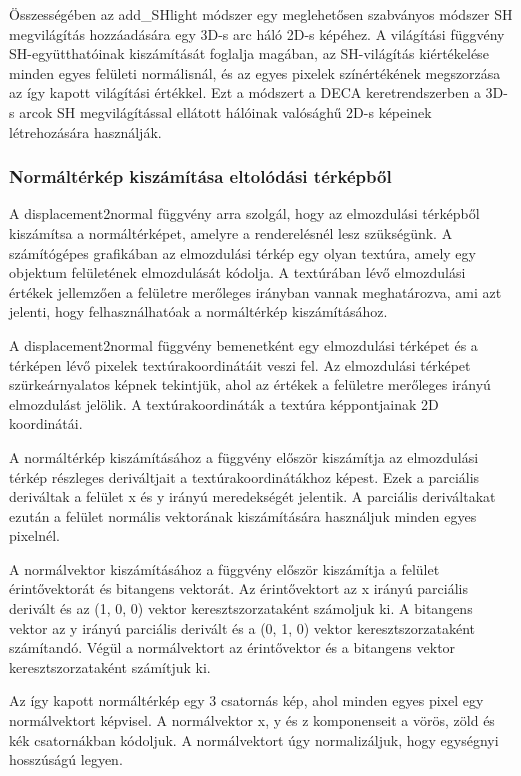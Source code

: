 \documentclass[12pt,a4]{article}
\begin{document}
Összességében az add\_SHlight módszer egy meglehetősen szabványos módszer SH megvilágítás hozzáadására egy 3D-s arc háló 2D-s képéhez. A világítási függvény SH-együtthatóinak kiszámítását foglalja magában, 
az SH-világítás kiértékelése minden egyes felületi normálisnál, és az egyes pixelek színértékének megszorzása az így kapott világítási értékkel. 
Ezt a módszert a DECA keretrendszerben a 3D-s arcok SH megvilágítással ellátott hálóinak valósághű 2D-s képeinek létrehozására használják.

\subsubsection{Normáltérkép kiszámítása eltolódási térképből}

A displacement2normal függvény arra szolgál, hogy az elmozdulási térképből kiszámítsa a normáltérképet, amelyre a renderelésnél lesz szükségünk. 
A számítógépes grafikában az elmozdulási térkép egy olyan textúra, amely egy objektum felületének elmozdulását kódolja.
A textúrában lévő elmozdulási értékek jellemzően a felületre merőleges irányban vannak meghatározva, ami azt jelenti, hogy felhasználhatóak a normáltérkép kiszámításához.

A displacement2normal függvény bemenetként egy elmozdulási térképet és a térképen lévő pixelek textúrakoordinátáit veszi fel. 
Az elmozdulási térképet szürkeárnyalatos képnek tekintjük, ahol az értékek a felületre merőleges irányú elmozdulást jelölik.
A textúrakoordináták a textúra képpontjainak 2D koordinátái.

A normáltérkép kiszámításához a függvény először kiszámítja az elmozdulási térkép részleges deriváltjait a textúrakoordinátákhoz képest.
Ezek a parciális deriváltak a felület x és y irányú meredekségét jelentik. A parciális deriváltakat ezután a felület normális vektorának kiszámítására használjuk minden egyes pixelnél.

A normálvektor kiszámításához a függvény először kiszámítja a felület érintővektorát és bitangens vektorát.
Az érintővektort az x irányú parciális derivált és az (1, 0, 0) vektor keresztszorzataként számoljuk ki. 
A bitangens vektor az y irányú parciális derivált és a (0, 1, 0) vektor keresztszorzataként számítandó. 
Végül a normálvektort az érintővektor és a bitangens vektor keresztszorzataként számítjuk ki.

Az így kapott normáltérkép egy 3 csatornás kép, ahol minden egyes pixel egy normálvektort képvisel. 
A normálvektor x, y és z komponenseit a vörös, zöld és kék csatornákban kódoljuk. 
A normálvektort úgy normalizáljuk, hogy egységnyi hosszúságú legyen.
\end{document}
